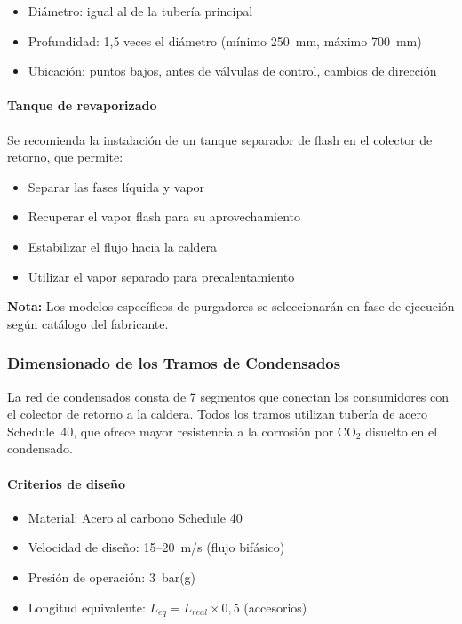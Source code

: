 \begin{itemize}[noitemsep]
	\item Diámetro: igual al de la tubería principal
	\item Profundidad: 1{,}5 veces el diámetro (mínimo 250~mm, máximo 700~mm)
	\item Ubicación: puntos bajos, antes de válvulas de control, cambios de dirección
\end{itemize}

\paragraph{Tanque de revaporizado}

Se recomienda la instalación de un tanque separador de flash en el colector de retorno, que permite:

\begin{itemize}[noitemsep]
	\item Separar las fases líquida y vapor
	\item Recuperar el vapor flash para su aprovechamiento
	\item Estabilizar el flujo hacia la caldera
	\item Utilizar el vapor separado para precalentamiento
\end{itemize}

\textbf{Nota:} Los modelos específicos de purgadores se seleccionarán en fase de ejecución según catálogo del fabricante.

\subsubsection{Dimensionado de los Tramos de Condensados}
\label{subsubsec:dimensionado-tramos-condensados}

La red de condensados consta de 7 segmentos que conectan los consumidores con el colector de retorno a la caldera. Todos los tramos utilizan tubería de acero Schedule~40, que ofrece mayor resistencia a la corrosión por CO$_2$ disuelto en el condensado.

\paragraph{Criterios de diseño}

\begin{itemize}[noitemsep]
	\item Material: Acero al carbono Schedule 40
	\item Velocidad de diseño: 15--20~m/s (flujo bifásico)
	\item Presión de operación: 3~bar(g)
	\item Longitud equivalente: $L_{eq} = L_{real} \times 0{,}5$ (accesorios)
\end{itemize}

